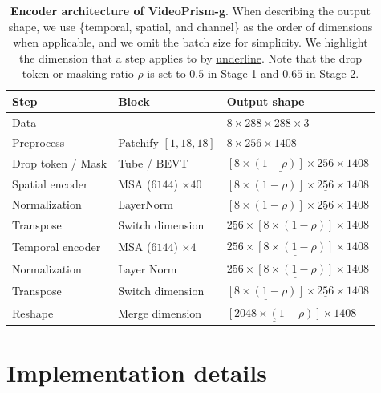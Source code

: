 \documentclass{article}
\theoremstyle{plain}
\theoremstyle{definition}
\theoremstyle{remark}
\newcommand{\OURS}{VideoPrism\xspace}
\begin{document}
\begin{table}[t]
    \caption{\textbf{Encoder architecture of \OURS-g}. When describing the output shape, we use \{temporal, spatial, and channel\} as the order of dimensions when applicable, and we omit the batch size for simplicity. We highlight the dimension that a step applies to by \underline{underline}. Note that the drop token or masking ratio $\rho$ is set to $0.5$ in Stage 1 and $0.65$ in Stage 2.}
	\label{tab:arch_encoder}
\begin{center}
\begin{scriptsize}
    \begin{tabular}	{@{}l|ll@{}}
        \toprule
        Step & Block & Output shape \\
        \midrule
        Data & - & $8 \times 288 \times 288 \times 3$ \\
        Preprocess & Patchify $[1, 18, 18]$ & $8 \times \underline{256} \times 1408 $\\
        Drop token / Mask & Tube / BEVT & $\underline{[8 \times (1-\rho)] \times 256} \times 1408$ \\
        Spatial encoder & MSA ($6144$) $\times 40$ & $[8 \times (1-\rho)] \times \underline{256} \times 1408 $ \\
Normalization & LayerNorm & $[8 \times (1-\rho)] \times \underline{256} \times 1408$ \\
        Transpose & Switch dimension & $\underline{256} \times \underline{[8\times(1-\rho)]} \times 1408$ \\
        Temporal encoder & MSA ($6144$) $\times 4$ & $256 \times \underline{[8\times(1-\rho)]} \times 1408$ \\
        Normalization & Layer Norm &  $256 \times \underline{[8\times(1-\rho)]} \times 1408$ \\
        Transpose & Switch dimension  &  $\underline{[8\times(1-\rho)]} \times \underline{256} \times 1408$ \\
        Reshape & Merge dimension & $\underline{[2048\times(1-\rho)]} \times 1408$ \\
    	\bottomrule
		\end{tabular}
\end{scriptsize}
	\end{center}
	\vskip -0.1in
\end{table}

\section{Implementation details}
\label{app:implement}
\end{document}

